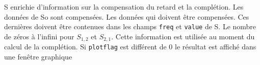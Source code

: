 %
%
%
%
%
%
%
%
{\fitem[So] S enrichie d'information sur la compensation du retard et la
  compl\'etion. Les donn\'ees de So sont compens\'ees.}
{\fitem[S] Les donn\'ees qui doivent \^etre compens\'ees. Ces derni\`eres 
doivent \^etre contenues dans les champs \texttt{freq} et \texttt{value} de S.
\fitem[zeros=DVC.CDAFS.zeros\_at\_inf] Le nombre de z\'eros \`a l'infini pour
$S_{1,2}$ et $S_{2,1}$. Cette information est utilis\'ee au moment du
calcul de la compl\'etion.
\fitem[plotflag=DVC.CDAFS.plot\_flag] Si \texttt{plotflag} est diff\'erent de 0 le
r\'esultat est affich\'e dans une fen\^etre graphique}
